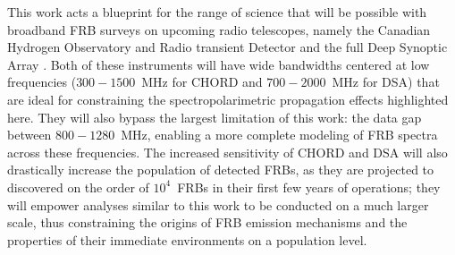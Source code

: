 \documentclass[twocolumn, linenumbers]{aastex701}
\begin{document}
This work acts a blueprint for the range of science that will be possible with broadband FRB surveys on upcoming radio telescopes, namely the Canadian Hydrogen Observatory and Radio transient Detector \citep[CHORD;][]{CHORD} and the full Deep Synoptic Array \citep[DSA;][]{DSA2000}. Both of these instruments will have wide bandwidths centered at low frequencies ($300-1500$~MHz for CHORD and $700-2000$~MHz for DSA) that are ideal for constraining the spectropolarimetric propagation effects highlighted here. They will also bypass the largest limitation of this work: the data gap between $800-1280$~MHz, enabling a more complete modeling of FRB spectra across these frequencies. The increased sensitivity of CHORD and DSA will also drastically increase the population of detected FRBs, as they are projected to discovered on the order of $10^4$~FRBs in their first few years of operations; they will empower analyses similar to this work to be conducted on a much larger scale, thus constraining the origins of FRB emission mechanisms and the properties of their immediate environments on a population level.
\end{document}
